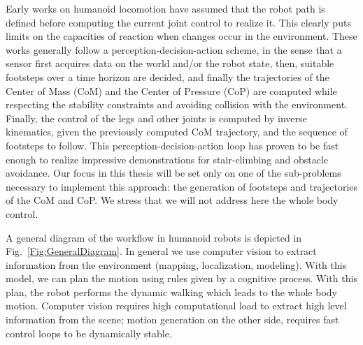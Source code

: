Early works on humanoid locomotion have assumed that the robot path is defined before computing the current joint control to realize it. This clearly puts limits on the capacities of reaction when changes occur in the environment. These works generally follow a perception-decision-action scheme, in the sense that a sensor first acquires data on the world and/or the robot state, then, suitable footsteps over a time horizon are decided, and finally the trajectories of the Center of Mass (CoM) and the Center of Pressure (CoP) are computed while respecting the stability constraints and avoiding collision with the environment. Finally, the control of the legs and other joints is computed by inverse kinematics, given the previously computed CoM trajectory, and the sequence of footsteps to follow. This perception-decision-action loop has proven to be fast enough  to realize impressive demonstrations for stair-climbing and obstacle avoidance. Our focus in this thesis will be set only on one of the sub-problems necessary to implement this approach: the generation of footsteps and trajectories of the CoM and CoP. We stress that we will not address here the whole body control.


A general diagram of the workflow in humanoid robots is depicted in Fig.~\ref{Fig:GeneralDiagram}. In general we use computer vision to extract information from the environment (mapping, localization, modeling). With this model, we can plan the motion using rules given by a cognitive process. With this plan, the robot performs the dynamic walking which leads to the whole body motion. Computer vision requires high computational load to extract high level information from the scene; motion generation on the other side, requires fast control loops to be dynamically stable. 

